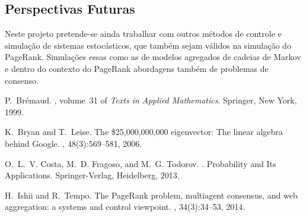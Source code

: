 \documentclass[a0,portrait]{a0poster}
\begin{document}
\begin{multicols}{2}
\section{Perspectivas Futuras}

Neste projeto pretende-se ainda trabalhar com outros m\'etodos de controle e simula\c{c}\~ao de sistemas estoc\'asticos, que tamb\'em sejam v\'alidos na simula\c{c}\~ao do PageRank. Simula\c{c}\~oes essas como as de modelos agregados de cadeias de Markov e dentro do contexto do PageRank abordagens tamb\'em de problemas de consenso.\\[-2em]


%
%


\begin{thebibliography}{1}

P.~Br\'emaud.
, volume~31 of {\em Texts in Applied Mathematics}.
\newblock Springer, New York, 1999.

K.~Bryan and T.~Leise.
\newblock The \$25,000,000,000 eigenvector: The linear algebra behind {G}oogle.
, 48(3):569--581, 2006.


O.~L.~V. Costa, M.~D. Fragoso, and M.~G. Todorov.
.
\newblock Probability and Its Applications. Springer-Verlag, Heidelberg, 2013.



H.~Ishii and R.~Tempo.
\newblock The {P}age{R}ank problem, multiagent consensus, and web aggregation:
  a systems and control viewpoint.
, 34(3):34--53, 2014.


\end{thebibliography}

\end{multicols}
\end{document}
